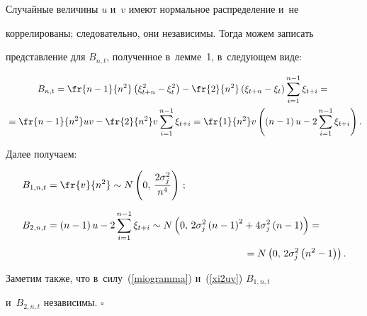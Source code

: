     Случайные величины $u$ и~$v$ имеют нормальное распределение и~не


    коррелированы; следовательно, они независимы. Тогда можем записать


    представление для $B_{n,t}$, полученное в~лемме~1, в~следующем виде:


    \begin{multline*}


        B_{n,t} = \fr{n-1}{n^2}\left(\xi^2_{t+n} - \xi^2_t\right) -


        \fr{2}{n^2}\left(\xi_{t+n}-\xi_t\right)\sum\limits^{n-1}_{i=1}\xi_{t+i} = {}\\


        {}=


        \fr{n-1}{n^2} uv - \fr{2}{n^2}v\sum\limits^{n-1}_{i=1}\xi_{t+i} =


        \fr{1}{n^2}v\left(\left(n-1\right)u -


        2\sum\limits^{n-1}_{i=1}\xi_{t+i}\right).


    \end{multline*}


    Далее получаем:


    \begin{align*}


        B_{1,n,t} &= \fr{v}{n^2} \sim N\left(0, \, \frac{2\sigma_j^2}{n^4}\right)\,;


\\[6pt]


        B_{2,n,t} &= \left(n-1\right)u - 2\sum\limits^{n-1}_{i=1}\xi_{t+i}


        \sim N\left(0,\,  2\sigma_j^2\left(n-1\right)^2 + 4\sigma_j^2


        \left(n-1\right)\right) ={} \\[3pt]


        &\hspace*{70mm}{}= N\left(0,\,  2\sigma_j^2\left(n^2-1\right)\right).


    \end{align*}


    Заметим также, что в~силу~(\ref{miogramma}) и~(\ref{xi2uv}) $B_{1,n,t}$


    и~$B_{2,n,t}$ независимы. \hfill$\square$








\smallskip






